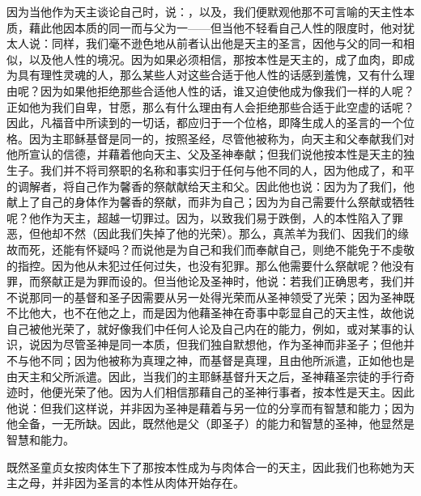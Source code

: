 因为当他作为天主谈论自己时，说：，以及，我们便默观他那不可言喻的天主性本质，藉此他因本质的同一而与父为一——但当他不轻看自己人性的限度时，他对犹太人说：同样，我们毫不逊色地从前者认出他是天主的圣言，因他与父的同一和相似，以及他人性的境况。因为如果必须相信，那按本性是天主的，成了血肉，即成为具有理性灵魂的人，那么某些人对这些合适于他人性的话感到羞愧，又有什么理由呢？因为如果他拒绝那些合适他人性的话，谁又迫使他成为像我们一样的人呢？正如他为我们自卑，甘愿，那么有什么理由有人会拒绝那些合适于此空虚的话呢？因此，凡福音中所读到的一切话，都应归于一个位格，即降生成人的圣言的一个位格。因为主耶稣基督是同一的，按照圣经，尽管他被称为，向天主和父奉献我们对他所宣认的信德，并藉着他向天主、父及圣神奉献；但我们说他按本性是天主的独生子。我们并不将司祭职的名称和事实归于任何与他不同的人，因为他成了，和平的调解者，将自己作为馨香的祭献献给天主和父。因此他也说：因为为了我们，他献上了自己的身体作为馨香的祭献，而非为自己；因为为自己需要什么祭献或牺牲呢？他作为天主，超越一切罪过。因为，以致我们易于跌倒，人的本性陷入了罪恶，但他却不然（因此我们失掉了他的光荣）。那么，真羔羊为我们、因我们的缘故而死，还能有怀疑吗？而说他是为自己和我们而奉献自己，则绝不能免于不虔敬的指控。因为他从未犯过任何过失，也没有犯罪。那么他需要什么祭献呢？他没有罪，而祭献正是为罪而设的。但当他论及圣神时，他说：若我们正确思考，我们并不说那同一的基督和圣子因需要从另一处得光荣而从圣神领受了光荣；因为圣神既不比他大，也不在他之上，而是因为他藉圣神在奇事中彰显自己的天主性，故他说自己被他光荣了，就好像我们中任何人论及自己内在的能力，例如，或对某事的认识，说因为尽管圣神是同一本质，但我们独自默想他，作为圣神而非圣子；但他并不与他不同；因为他被称为真理之神，而基督是真理，且由他所派遣，正如他也是由天主和父所派遣。因此，当我们的主耶稣基督升天之后，圣神藉圣宗徒的手行奇迹时，他便光荣了他。因为人们相信那藉自己的圣神行事者，按本性是天主。因此他说：但我们这样说，并非因为圣神是藉着与另一位的分享而有智慧和能力；因为他全备，一无所缺。因此，既然他是父（即圣子）的能力和智慧的圣神，他显然是智慧和能力。\par

既然圣童贞女按肉体生下了那按本性成为与肉体合一的天主，因此我们也称她为天主之母，并非因为圣言的本性从肉体开始存在。\par

